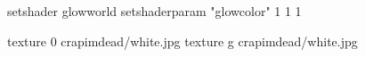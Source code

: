 setshader glowworld
setshaderparam "glowcolor" 1 1 1

texture 0 crapimdead/white.jpg
texture g crapimdead/white.jpg

